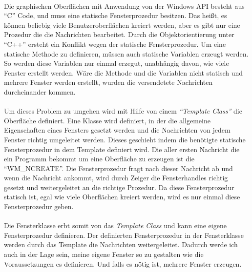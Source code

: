 \paragraph{}
Die graphischen Oberflächen mit Anwendung von der Windows API besteht aus "`C"' Code, und muss eine statische Fensterprozedur besitzen. Das heißt, es können beliebig viele Benutzeroberflächen kreiert werden, aber es gibt nur eine Prozedur die die Nachrichten bearbeitet. Durch die Objektorientierung unter "`C++"' ersteht ein Konflikt wegen der statische Fensterprozedur. Um eine statische Methode zu definieren, müssen auch statische Variablen erzeugt werden. So werden diese Variablen nur einmal erzegut, unabhängig davon, wie viele Fenster erstellt werden. Wäre die Methode und die Variablen nicht statisch und mehrere Fenster werden erstellt, wurden die versendetete Nachrichten durcheinander kommen.

\paragraph{}
Um dieses Problem zu umgehen wird mit Hilfe von einem \textit{"`Template Class"'} die Oberfläche definiert. Eine Klasse wird definiert, in der die allgemeine Eigenschaften eines Fensters gesetzt werden und die Nachrichten von jedem Fenster richtig umgeleitet werden. Dieses geschieht indem die benötigte statische Fensterprozedur in dem Template definiert wird. Die aller ersten Nachricht die ein Programm bekommt um eine Oberfläche zu erzeugen ist die "`WM\_NCREATE"'. Die Fensterprozedur fragt nach dieser Nachricht ab und wenn die Nachricht ankommt, wird durch Zeiger die Fensterhandles richtig gesetzt und weitergeleitet an die richtige Prozedur. Da diese Fensterprozedur statisch ist, egal wie viele Oberflächen kreiert werden, wird es nur einmal diese Fensterprozedur geben.

\paragraph{}
Die Fensterklasse erbt somit von das \textit{Template Class} und kann eine eigene Fensterprozedur definieren. Der definierten Fensterprozedur in der Fensterklasse werden durch das Template die Nachrichten weitergeleitet. Dadurch werde ich auch in der Lage sein, meine eigene Fenster so zu gestalten wie die Voraussetzungen es definieren. Und falls es nötig ist, mehrere Fenster erzeugen.